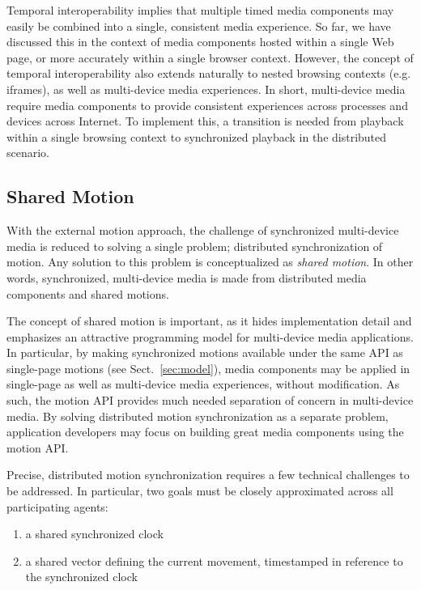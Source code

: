 Temporal interoperability implies that multiple timed media components may
easily be combined into a single, consistent media experience. So far, we have
discussed this in the context of media components hosted within a single Web
page, or more accurately within a single browser context. However, the concept
of temporal interoperability also extends naturally to nested browsing
contexts (e.g. iframes), as well as multi-device media experiences. In short,
multi-device media require media components to provide consistent experiences
across processes and devices across Internet. To implement this, a transition
is needed from playback within a single browsing context to synchronized
playback in the distributed scenario.

\subsection {Shared Motion}

With the external motion approach, the challenge of synchronized multi-device
media is reduced to solving a single problem; distributed synchronization of
motion. Any solution to this problem is conceptualized as \emph{shared motion}. In
other words, synchronized, multi-device media is made from distributed media
components and shared motions.

The concept of shared motion is important, as it hides implementation detail
and emphasizes an attractive programming model for multi-device media
applications. In particular, by making synchronized motions available under
the same API as single-page motions (see Sect.~\ref{sec:model}), media components may be
applied in single-page as well as multi-device media experiences, without
modification. As such, the motion API provides much needed separation of
concern in multi-device media. By solving distributed motion synchronization
as a separate problem, application developers may focus on building great
media components using the motion API.



Precise, distributed motion synchronization requires a few technical
challenges to be addressed. In particular, two goals must be closely
approximated across all participating agents:

\begin{enumerate}
\item{a shared synchronized clock}
\item{a shared vector defining the current movement, timestamped in reference to the
synchronized clock}
\end{enumerate}

